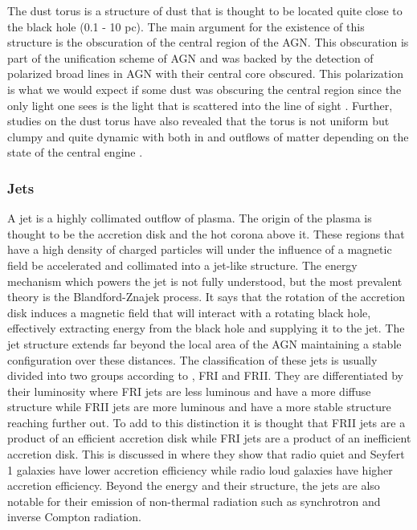The dust torus is a structure of dust that is thought to be located quite close to the black hole (0.1 - 10 pc). The main argument for the existence of this structure is the obscuration of the central region of the AGN. This obscuration 
is part of the unification scheme of AGN and was backed by the detection of polarized broad lines in AGN with their central core obscured. This polarization is what we would expect if some dust was obscuring the central region since the only light one sees is 
the light that is scattered into the line of sight \cite{MASON201597}. Further, studies on the dust torus have also revealed that the torus is not uniform but clumpy and quite dynamic with both in and outflows of matter depending on the state of the central engine \cite{MASON201597}. 





\subsubsection{Jets}
\label{sec:jets}

A jet is a highly collimated outflow of plasma. The origin of the plasma is thought to be the accretion disk and the hot corona above it. These regions that have a high density of charged particles will under the influence of a magnetic field be accelerated and collimated into a jet-like structure.
The energy mechanism which powers the jet is not fully understood, but the most prevalent theory is the Blandford-Znajek process. It says that the rotation of the accretion disk induces a magnetic field that will interact with a rotating black hole, effectively extracting energy from the black hole and supplying it to the jet. 
The jet structure extends far beyond the local area of the AGN maintaining a stable configuration over these distances. The classification of these jets is usually divided into two groups according to \cite{walg2013relativistic}, FRI and FRII. They are differentiated by their luminosity where FRI jets are less luminous and have a more diffuse structure while FRII jets are more luminous and have a more stable structure reaching further out.
To add to this distinction it is thought that FRII jets are a product of an efficient accretion disk while FRI jets are a product of an inefficient accretion disk. This is discussed in \cite{Wei-Hao_2003} where they show that radio quiet and Seyfert 1 galaxies have lower accretion efficiency while radio loud galaxies have higher accretion efficiency. 
Beyond the energy and their structure, the jets are also notable for their emission of non-thermal radiation such as synchrotron and inverse Compton radiation. %








